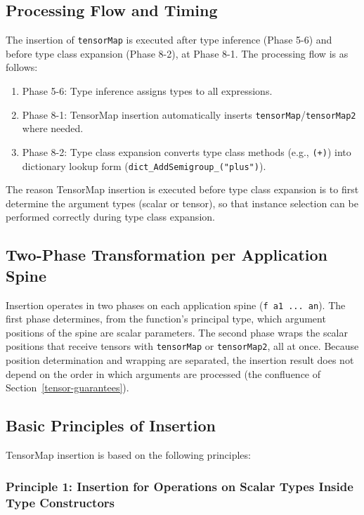 \subsection{Processing Flow and Timing}

The insertion of \lstinline{tensorMap} is executed after type inference (Phase 5-6) and before type class expansion (Phase 8-2), at Phase 8-1.
The processing flow is as follows:

\begin{enumerate}
\item Phase 5-6: Type inference assigns types to all expressions.
\item Phase 8-1: TensorMap insertion automatically inserts \lstinline{tensorMap}/\lstinline{tensorMap2} where needed.
\item Phase 8-2: Type class expansion converts type class methods (e.g., \lstinline{(+)}) into dictionary lookup form (\lstinline{dict_AddSemigroup_("plus")}).
\end{enumerate}

The reason TensorMap insertion is executed before type class expansion is to first determine the argument types (scalar or tensor), so that instance selection can be performed correctly during type class expansion.

\subsection{Two-Phase Transformation per Application Spine}

Insertion operates in two phases on each application spine (\lstinline{f a1 ... an}).
The first phase determines, from the function's principal type, which argument positions of the spine are scalar parameters.
The second phase wraps the scalar positions that receive tensors with \lstinline{tensorMap} or \lstinline{tensorMap2}, all at once.
Because position determination and wrapping are separated, the insertion result does not depend on the order in which arguments are processed (the confluence of Section~\ref{tensor-guarantees}).

\subsection{Basic Principles of Insertion}

TensorMap insertion is based on the following principles:

\subsubsection{Principle 1: Insertion for Operations on Scalar Types Inside Type Constructors}

